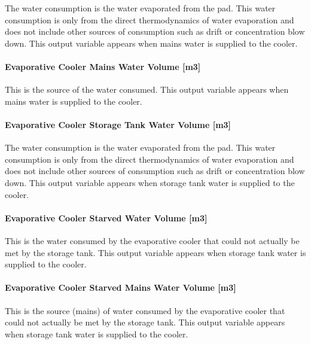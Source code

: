 The water consumption is the water evaporated from the pad. This water consumption is only from the direct thermodynamics of water evaporation and does not include other sources of consumption such as drift or concentration blow down. This output variable appears when mains water is supplied to the cooler.

\paragraph{Evaporative Cooler Mains Water Volume {[}m3{]}}\label{evaporative-cooler-mains-water-volume-m3-4}

This is the source of the water consumed. This output variable appears when mains water is supplied to the cooler.

\paragraph{Evaporative Cooler Storage Tank Water Volume {[}m3{]}}\label{evaporative-cooler-storage-tank-water-volume-m3-4}

The water consumption is the water evaporated from the pad. This water consumption is only from the direct thermodynamics of water evaporation and does not include other sources of consumption such as drift or concentration blow down. This output variable appears when storage tank water is supplied to the cooler.

\paragraph{Evaporative Cooler Starved Water Volume {[}m3{]}}\label{evaporative-cooler-starved-water-volume-m3-4}

This is the water consumed by the evaporative cooler that could not actually be met by the storage tank. This output variable appears when storage tank water is supplied to the cooler.

\paragraph{Evaporative Cooler Starved Mains Water Volume {[}m3{]}}\label{evaporative-cooler-starved-mains-water-volume-m3-4}

This is the source (mains) of water consumed by the evaporative cooler that could not actually be met by the storage tank. This output variable appears when storage tank water is supplied to the cooler.
